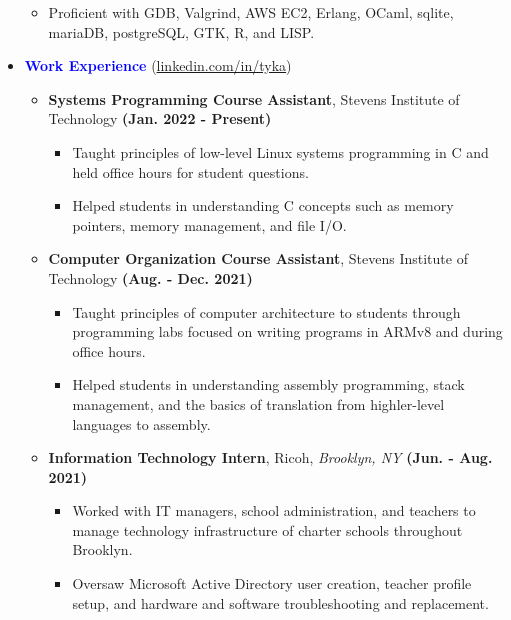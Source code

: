 \documentclass[11pt]{article}
\begin{document}
\begin{flushleft}
\begin{itemize}
\begin{itemize}
            \item Proficient with GDB, Valgrind, AWS EC2, Erlang, OCaml, sqlite, mariaDB, postgreSQL, GTK, R, and LISP.
        \end{itemize}
    \item[] \Large \textcolor{blue}{\textbf{Work Experience}} (\href{https://linkedin.com/in/tyka}{linkedin.com/in/tyka}) \normalsize
        \begin{itemize}
            \item \textbf{Systems Programming Course Assistant}, Stevens Institute of Technology \hfill{\textbf{(Jan. 2022 - Present)}}
                \begin{itemize}
                    \item Taught principles of low-level Linux systems programming in C and held office hours for student questions.
                    \item Helped students in understanding C concepts such as memory pointers, memory management, and file I/O.
                \end{itemize}
            \item \textbf{Computer Organization Course Assistant}, Stevens Institute of Technology \hfill{\textbf{(Aug. - Dec. 2021)}}
                \begin{itemize}
                    \item Taught principles of computer architecture to students through programming labs focused on writing programs in ARMv8 and during office hours.
                    \item Helped students in understanding assembly programming, stack management, and the basics of translation from highler-level languages to assembly.
                \end{itemize}
            \item \textbf{Information Technology Intern}, Ricoh, \textit{Brooklyn, NY} \hfill{\textbf{(Jun. - Aug. 2021)}}
                \begin{itemize}
                    \item Worked with IT managers, school administration, and teachers to manage technology infrastructure of charter schools throughout Brooklyn.
                    \item Oversaw Microsoft Active Directory user creation, teacher profile setup, and hardware and software troubleshooting and replacement.
                \end{itemize}
        \end{itemize}

\end{itemize}
\end{flushleft}
\end{document}
